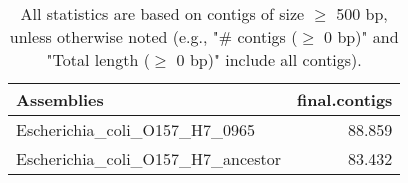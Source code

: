 \documentclass[12pt,a4paper]{article}
\begin{document}
\begin{table}[ht]
\begin{center}
\caption{All statistics are based on contigs of size $\geq$ 500 bp, unless otherwise noted (e.g., "\# contigs ($\geq$ 0 bp)" and "Total length ($\geq$ 0 bp)" include all contigs).}
\begin{tabular}{|l*{1}{|r}|}
\hline
Assemblies & final.contigs \\ \hline
Escherichia\_coli\_O157\_H7\_0965 & 88.859 \\ \hline
Escherichia\_coli\_O157\_H7\_ancestor & 83.432 \\ \hline
\end{tabular}
\end{center}
\end{table}
\end{document}
